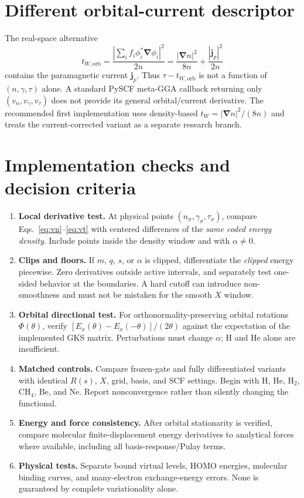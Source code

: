 \documentclass[11pt,a4paper]{article}
\newcommand{\grad}{\boldsymbol\nabla}
\begin{document}
\section{Different orbital-current descriptor}
The real-space alternative
\begin{equation}
t_{W,\mathrm{orb}}=\frac{|\sum_i f_i\phi_i^*\grad\phi_i|^2}{2n}=\frac{|\grad n|^2}{8n}+\frac{|\mathbf j_p|^2}{2n}
\end{equation}
contains the paramagnetic current $\mathbf j_p$. Thus $\tau-t_{W,\mathrm{orb}}$ is not a function of $(n,\gamma,\tau)$ alone. A standard PySCF meta-GGA callback returning only $(v_n,v_\gamma,v_\tau)$ does not provide its general orbital/current derivative. The recommended first implementation uses density-based $t_W=|\grad n|^2/(8n)$ and treats the current-corrected variant as a separate research branch.

\section{Implementation checks and decision criteria}
\begin{enumerate}
\item \textbf{Local derivative test.} At physical points $(n_\sigma,\gamma_\sigma,\tau_\sigma)$, compare Eqs.~\eqref{eq:vn}--\eqref{eq:vt} with centered differences of the \emph{same coded energy density}. Include points inside the density window and with $\alpha\ne0$.
\item \textbf{Clips and floors.} If $m$, $q$, $s$, or $\alpha$ is clipped, differentiate the \emph{clipped} energy piecewise. Zero derivatives outside active intervals, and separately test one-sided behavior at the boundaries. A hard cutoff can introduce non-smoothness and must not be mistaken for the smooth $X$ window.
\item \textbf{Orbital directional test.} For orthonormality-preserving orbital rotations $\Phi(\theta)$, verify $[E_x(\theta)-E_x(-\theta)]/(2\theta)$ against the expectation of the implemented GKS matrix. Perturbations must change $\alpha$; H and He alone are insufficient.
\item \textbf{Matched controls.} Compare frozen-gate and fully differentiated variants with identical $R(s)$, $X$, grid, basis, and SCF settings. Begin with H, He, H$_2$, CH$_4$, Be, and Ne. Report nonconvergence rather than silently changing the functional.
\item \textbf{Energy and force consistency.} After orbital stationarity is verified, compare molecular finite-displacement energy derivatives to analytical forces where available, including all basis-response/Pulay terms.
\item \textbf{Physical tests.} Separate bound virtual levels, HOMO energies, molecular binding curves, and many-electron exchange-energy errors. None is guaranteed by complete variationality alone.
\end{enumerate}
\end{document}
